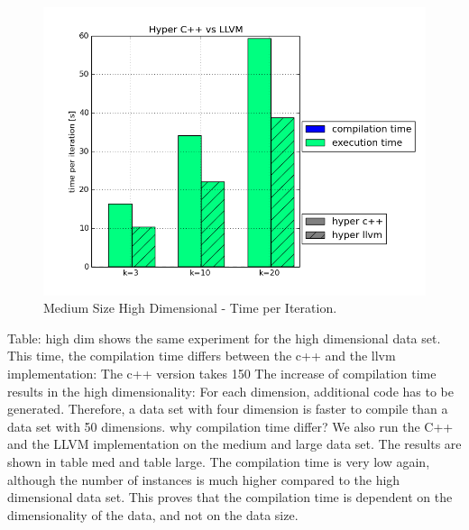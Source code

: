 \begin{figure}[htsb]
  \centering
  \includegraphics[scale=0.4, trim="0cm 1.5cm 0cm 0cm"]{figures/charts/hyper_15Mxhd}
  \caption[Medium Size High Dimensional - Time per Iteration]{Medium Size High Dimensional - Time per Iteration.}
  \label{fig:hyper_15Mxhd}
\end{figure}



Table: high dim shows the same experiment for the high dimensional data set. This time, the compilation time differs between the c++ and the llvm implementation: The c++ version takes 150%
The increase of compilation time results in the high dimensionality: For each dimension, additional code has to be generated. Therefore, a data set with four dimension is faster to compile than a data set with 50 dimensions.
why compilation time differ?
We also run the C++ and the LLVM implementation on the medium and large data set. The results are shown in table med and table large. The compilation time is very low again, although the number of instances is much higher compared to the high dimensional data set. This proves that the compilation time is dependent on the dimensionality of the data, and not on the data size.


